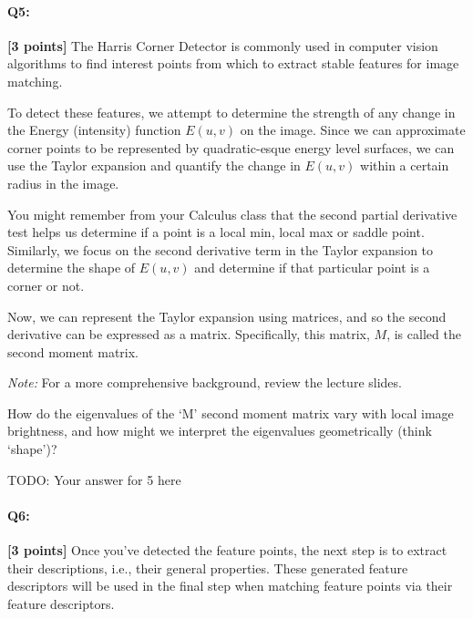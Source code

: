 \pagebreak




\pagebreak
\paragraph{Q5:} \textbf{[3 points]}
The Harris Corner Detector is commonly used in computer vision algorithms to find interest points from which to extract stable features for image matching.

To detect these features, we attempt to determine the strength of any change in the Energy (intensity) function $E(u, v)$ on the image. Since we can approximate corner points to be represented by quadratic-esque energy level surfaces, we can use the Taylor expansion and quantify the change in $E(u, v)$ within a certain radius in the image.

You might remember from your Calculus class that the second partial derivative test helps us determine if a point is a local min, local max or saddle point. Similarly, we focus on the second derivative term in the Taylor expansion to determine the shape of $E(u, v)$ and determine if that particular point is a corner or not.

Now, we can represent the Taylor expansion using matrices, and so the second derivative can be expressed as a matrix. Specifically, this matrix, $M$, is called the second moment matrix.

\textit{Note:} For a more comprehensive background, review the lecture slides.

How do the eigenvalues of the `M' second moment matrix vary with local image brightness, and how might we interpret the eigenvalues geometrically (think `shape')?

\begin{mdframed}
    TODO: Your answer for 5 here
\end{mdframed}








\pagebreak
\paragraph{Q6:} \textbf{[3 points]}
Once you've detected the feature points, the next step is to extract their descriptions, i.e., their general properties. These generated feature descriptors will be used in the final step when matching feature points via their feature descriptors.

